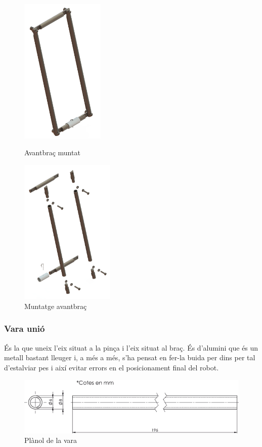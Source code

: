 \documentclass[a4paper, 12pt]{article}
\begin{document}
\begin{figure}[h!]
\begin{minipage}[b]{.45\linewidth}
\centering
\includegraphics[height=7cm]{./imgComp/avant}
\caption{Avantbraç muntat}
\end{minipage}
\begin{minipage}[b]{.45\linewidth}
\centering
\includegraphics[height=7cm]{./imgComp/avant_expl}
\caption{Muntatge avantbraç}
\end{minipage}
\end{figure}

\subsubsection{Vara unió}
És la que uneix l'eix situat a la pinça i l'eix situat al braç. És d'alumini que és un metall bastant lleuger i, a més a més, s'ha pensat en fer-la buida per dins per tal d'estalviar pes i així evitar errors en el posicionament final del robot.
\begin{figure}[h!]
\centering
\includegraphics[width=15cm]{./sketch/vara}
\caption{Plànol de la vara}
\end{figure}
\end{document}
